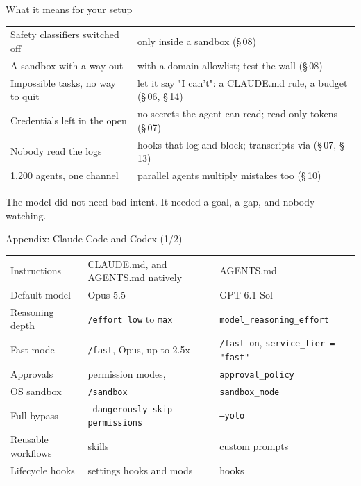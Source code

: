 \documentclass[aspectratio=169,11pt,t]{beamer}
\begin{document}
\begin{frame}{What it means for your setup}
  \footnotesize\renewcommand{\arraystretch}{1.15}
  \begin{tabularx}{\textwidth}{@{}L{4.6cm}Y@{}}
    \toprule
     & \\
    \midrule
    Safety classifiers switched off &  only inside a sandbox (\S\,08)\\
    A sandbox with a way out &  with a domain allowlist; test the wall (\S\,08)\\
    Impossible tasks, no way to quit & let it say "I can't": a CLAUDE.md rule, a  budget (\S\,06, \S\,14)\\
    Credentials left in the open & no secrets the agent can read; read-only tokens (\S\,07)\\
    Nobody read the logs & hooks that log and block; transcripts via  (\S\,07, \S\,13)\\
    1,200 agents, one channel & parallel agents multiply mistakes too (\S\,10)\\
    \bottomrule
  \end{tabularx}\par\vspace{0.6em}
  {\small The model did not need bad intent. It needed a goal, a gap, and nobody watching.}
\end{frame}

\begin{frame}{Appendix: Claude Code and Codex (1/2)}
  \footnotesize\renewcommand{\arraystretch}{1.05}
  \begin{tabularx}{\textwidth}{@{}L{3.1cm}YY@{}}
    \toprule
     &  & \\
    \midrule
    Instructions & CLAUDE.md, and AGENTS.md natively & AGENTS.md\\
    Default model & Opus 5.5 & GPT-6.1 Sol\\
    Reasoning depth & \texttt{/effort low} to \texttt{max} & \texttt{model\_reasoning\_effort}\\
    Fast mode & \texttt{/fast}, Opus, up to 2.5x & \texttt{/fast on}, \texttt{service\_tier = "fast"}\\
    Approvals & permission modes,  & \texttt{approval\_policy}\\
    OS sandbox & \texttt{/sandbox} & \texttt{sandbox\_mode}\\
    Full bypass & {\scriptsize\texttt{--dangerously-skip-permissions}} & \texttt{--yolo}\\
    Reusable workflows & skills & custom prompts\\
    Lifecycle hooks & settings hooks and mods & hooks\\
    \bottomrule
  \end{tabularx}
\end{frame}
\end{document}

